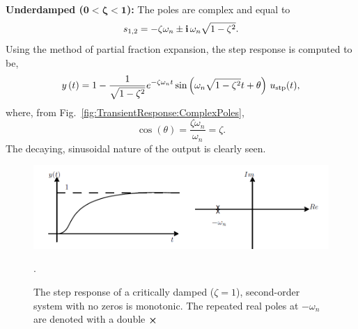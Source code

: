 \textbf{Underdamped ($\bm{0<\zeta<1}$):} The poles are complex and equal to
\begin{equation}
\label{eqn:TransientResponse:UnderdampedPoles}
s_{1,2}  =  - \zeta \omega _n  \pm \mathop{\bm{\mathrm i}} \omega _n \sqrt{ 1 - \zeta^2 }.
\end{equation}
Using the method of partial fraction expansion, the step response is computed to be, 
\begin{equation}
\label{eqn:TransientResponse:UnderdampedStepResponse}
y\left( t \right) = 1 - \frac{1}{{\sqrt {1 - \zeta ^2 } }}e^{ - \zeta \omega _n t} \sin \left( {\omega _n \sqrt {1 - \zeta ^2 } t + \theta } \right)\, u_{\rm stp}(t),
\end{equation}
where, from Fig.~\ref{fig:TransientResponse:ComplexPoles},
$$
\cos(\theta)  = \frac{\zeta \omega_n}{\omega_n} = \zeta.
$$
The decaying, sinusoidal nature of the output is clearly seen.

\bigskip



\begin{figure}[hbt]
	\centering
		\includegraphics[width=0.9\linewidth]{graphics/Chap10/CriticallyDamped_NoZeros.png}
	\caption{The step response of a critically damped ($\zeta=1$), second-order system with no zeros is monotonic. The repeated real poles at $-\omega_n$ are denoted with a double ${\mathlarger{ \bm{\times}}}$}.
	\label{fig:TransientResponse:CriciallyDampedStepResponse}
\end{figure}


